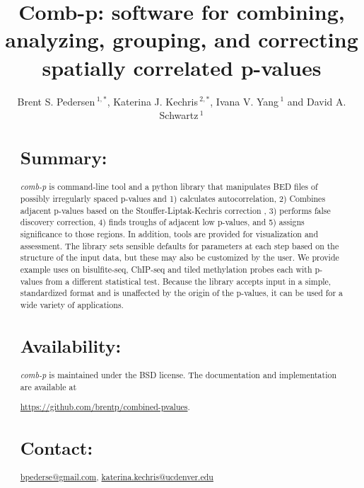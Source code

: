 \documentclass{bioinfo}
\begin{document}

\title[comb-p]{Comb-p: software for combining, analyzing, grouping, and correcting spatially correlated p-values}
\author[Pedersen \textit{et~al}]{Brent S. Pedersen\,$^{1,*}$,
Katerina J.  Kechris\,$^{2,*}$,
    Ivana V. Yang\,$^{1}$ and David A. Schwartz\,$^1$}
\address{$^{1}$Department of Medicine, University of Colorado, Denver, Anschutz Medical Campus, Aurora CO 80045, USA\\
$^{2}$Department of Statistics, University of Colorado, Denver, Anschutz Medical Campus, Aurora CO 80045, USA\\
}
\maketitle
\begin{abstract}

\section{Summary:}
\textit{comb-p} is command-line tool and a python library that
manipulates BED files of possibly irregularly spaced p-values and
1) calculates autocorrelation,
2) Combines adjacent p-values based on the Stouffer-Liptak-Kechris correction \citep{Kechris2010},
3) performs false discovery correction,
4) finds troughs of adjacent low p-values, and
5) assigns significance to those regions.
In addition, tools are provided for visualization and
assessment. The library sets sensible defaults for parameters at each
step based on the structure of the input data, but these may also be customized
by the user. We provide example uses on bisulfite-seq, ChIP-seq and tiled methylation
probes each with p-values from a different statistical test. Because the library
accepts input in a simple, standardized format and is unaffected by the origin
of the p-values, it can be used for a wide variety of applications.

\section{Availability:}
\textit{comb-p} is maintained under the BSD license. The documentation and
implementation are available at

\href{https://github.com/brentp/combined-pvalues}{https://github.com/brentp/combined-pvalues}.
\section{Contact:} \href{bpederse@gmail.com}{bpederse@gmail.com},
\href{katerina.kechris@ucdenver.edu}{katerina.kechris@ucdenver.edu}

\end{abstract}
\end{document}

